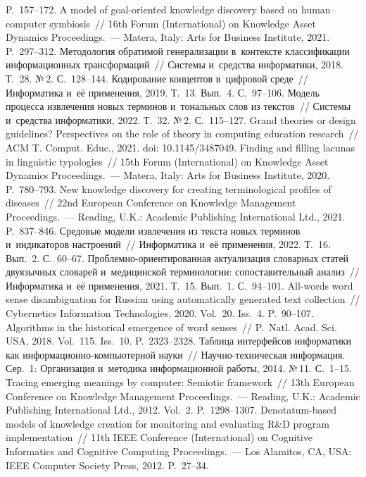 \begin{multicols}{2}
{{\begin{thebibliography}{99}
P.~157--172.
 A model of goal-oriented knowledge discovery based on human--computer 
symbiosis~// 16th Forum (International) on Knowledge Asset Dynamics Proceedings.~--- 
Matera, Italy: Arts for Business Institute, 2021. P.~297--312.
 Методология обратимой генерализации в~контексте классификации 
информационных трансформаций~// Системы и~средства информатики, 2018. Т.~28. №\,2. 
С.~128--144.
 Кодирование концептов в~цифровой среде~// Информатика и~её 
применения, 2019. Т.~13. Вып.~4. С.~97--106.
 Модель процесса извлечения новых терминов и~тональных слов из 
текстов~// Системы и~средства информатики, 2022. Т.~32. №\,2. С.~115--127.
 Grand theories or design guidelines? Perspectives on the role of 
theory in computing education research~// ACM T. Comput. Educ., 2021. 
doi: 10.1145/3487049.
 Finding and filling lacunas in linguistic typologies~// 15th  Forum (International) 
on Knowledge Asset Dynamics Proceedings.~--- Matera, Italy: Arts for Business Institute, 2020. 
P.~780--793.
 New knowledge discovery for creating terminological profiles 
of diseases~// 22nd European Conference on Knowledge Management Proceedings.~--- Reading, 
U.K.: Academic Publishing International Ltd., 2021. P.~837--846.
 Средовые модели извлечения из 
текста новых терминов и~индикаторов настроений~// Информатика и~её применения, 2022. 
Т.~16. Вып.~2. С.~60--67.
 Проблемно-ориентированная актуализация словарных статей 
двуязычных словарей и~медицинской терминологии: сопоставительный анализ~// 
Информатика и~её применения, 2021. Т.~15. Вып.~1. С.~94--101.
 All-words word sense disambiguation for Russian using 
automatically generated text collection~// Cybernetics Information Technologies, 2020. 
Vol.~20. Iss.~4. P.~90--107.
 Algorithms in the historical emergence of 
word senses~// P.~Natl. Acad. Sci. USA, 2018. Vol.~115. Iss.~10. 
P.~2323--2328.
 Таблица интерфейсов информатики как  
ин\-фор\-ма\-ци\-он\-но-компью\-тер\-ной науки~// На\-уч\-но-тех\-ни\-че\-ская 
информация. Сер.~1: Организация и~методика информационной работы, 2014. №\,11.  
С.~1--15.
 Tracing emerging meanings by computer: Semiotic framework~// 13th European 
Conference on Knowledge Management Proceedings.~--- Reading, U.K.: Academic Publishing 
International Ltd., 2012. Vol.~2. P.~1298--1307.
 Denotatum-based models of knowledge creation for monitoring and evaluating 
R\&D program implementation~// 11th IEEE Conference (International) on Cognitive 
Informatics and Cognitive Computing Proceedings.~--- Los Alamitos, CA, USA: IEEE 
Computer Society Press, 2012. P.~27--34.


\end{thebibliography}}}
\end{multicols}
